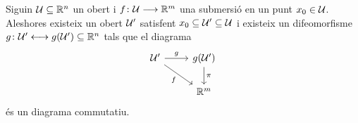 \documentclass[../Apunts.tex]{subfiles}
\begin{document}
	\begin{theorem}
		\label{thm:Teorema d'estructura local de les submersions}
		Siguin \(\mathcal{U}\subseteq\mathbb{R}^{n}\) un obert i \(f\colon\mathcal{U}\longrightarrow\mathbb{R}^{m}\) una submersió en un punt \(x_{0}\in\mathcal{U}\). Aleshores existeix un obert \(\mathcal{U}'\) satisfent \(x_{0}\subseteq\mathcal{U}'\subseteq\mathcal{U}\) i existeix un difeomorfisme \(g\colon\mathcal{U}'\longleftrightarrow g(\mathcal{U}')\subseteq\mathbb{R}^{n}\) tals que el diagrama
		\[\begin{tikzcd}
			\obert{U}' \arrow{r}{g} \arrow[swap]{dr}{f} & g(\obert{U}') \arrow{d}{\pi} \\
			& \mathbb{R}^{m}
		\end{tikzcd}\]
		és un diagrama commutatiu.
	\end{theorem}
\end{document}
